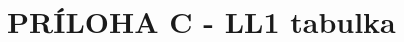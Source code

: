 \documentclass[Slovak, a4paper, 12pt]{article}
\begin{document}
	\section{PRÍLOHA C - LL1 tabulka}
	\newpage
	\begin{figure}[ht]
		\begin{center}
		\end{center}
	\end{figure}
	\FloatBarrier
	\begin{figure}[ht]
		\begin{center}
		\end{center}
	\end{figure}
	\FloatBarrier
	
	\newpage
\end{document}
